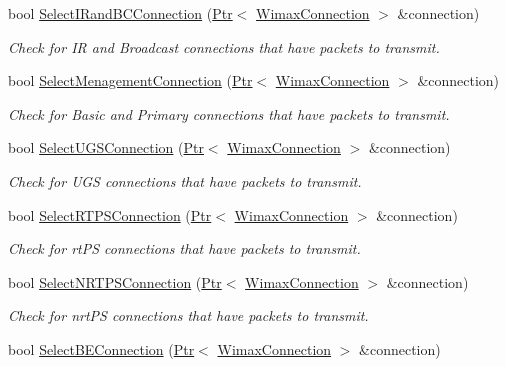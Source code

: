 \begin{DoxyCompactItemize}
bool \hyperlink{classns3_1_1BSSchedulerRtps_aeea01c34ea087a03188d0ae8d07f57ae}{Select\+I\+Rand\+B\+C\+Connection} (\hyperlink{classns3_1_1Ptr}{Ptr}$<$ \hyperlink{classns3_1_1WimaxConnection}{Wimax\+Connection} $>$ \&connection)
\begin{DoxyCompactList}\small\item\em Check for IR and Broadcast connections that have packets to transmit. \end{DoxyCompactList}\item 
bool \hyperlink{classns3_1_1BSSchedulerRtps_a9c66335cafc7834a3b0de47df0f69913}{Select\+Menagement\+Connection} (\hyperlink{classns3_1_1Ptr}{Ptr}$<$ \hyperlink{classns3_1_1WimaxConnection}{Wimax\+Connection} $>$ \&connection)
\begin{DoxyCompactList}\small\item\em Check for Basic and Primary connections that have packets to transmit. \end{DoxyCompactList}\item 
bool \hyperlink{classns3_1_1BSSchedulerRtps_ac9e83b101579949c8e044920fe35a533}{Select\+U\+G\+S\+Connection} (\hyperlink{classns3_1_1Ptr}{Ptr}$<$ \hyperlink{classns3_1_1WimaxConnection}{Wimax\+Connection} $>$ \&connection)
\begin{DoxyCompactList}\small\item\em Check for U\+GS connections that have packets to transmit. \end{DoxyCompactList}\item 
bool \hyperlink{classns3_1_1BSSchedulerRtps_a6253d8d6989392c373a6aa5bd59176fc}{Select\+R\+T\+P\+S\+Connection} (\hyperlink{classns3_1_1Ptr}{Ptr}$<$ \hyperlink{classns3_1_1WimaxConnection}{Wimax\+Connection} $>$ \&connection)
\begin{DoxyCompactList}\small\item\em Check for rt\+PS connections that have packets to transmit. \end{DoxyCompactList}\item 
bool \hyperlink{classns3_1_1BSSchedulerRtps_a75902c5d51c9a9088553e51bc918fa97}{Select\+N\+R\+T\+P\+S\+Connection} (\hyperlink{classns3_1_1Ptr}{Ptr}$<$ \hyperlink{classns3_1_1WimaxConnection}{Wimax\+Connection} $>$ \&connection)
\begin{DoxyCompactList}\small\item\em Check for nrt\+PS connections that have packets to transmit. \end{DoxyCompactList}\item 
bool \hyperlink{classns3_1_1BSSchedulerRtps_ada0902fd806be05be27b260cb960f9cc}{Select\+B\+E\+Connection} (\hyperlink{classns3_1_1Ptr}{Ptr}$<$ \hyperlink{classns3_1_1WimaxConnection}{Wimax\+Connection} $>$ \&connection)

\end{DoxyCompactItemize}

